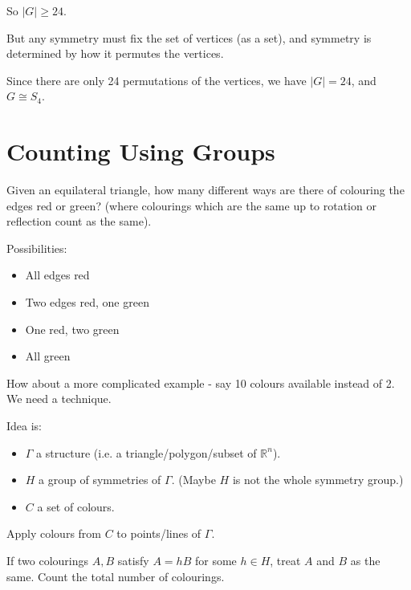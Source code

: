 \documentclass{article}
\theoremstyle{definition}
\newcommand{\reals}{\mathbb{R}}
\newcommand{\ism}{\cong}
\begin{document}
  So $|G| \geq 24$.

  But any symmetry must fix the set of vertices (as a set), and symmetry is determined by how it permutes the vertices.

  Since there are only 24 permutations of the vertices, we have $|G|=24$, and $G \ism S_4$.
\newpage
  \section{Counting Using Groups}
  Given an equilateral triangle, how many different ways are there of colouring the edges red or green? (where colourings which are the same up to rotation or reflection count as the same). 

  Possibilities: 
  \begin{itemize}
    \item All edges red
    \item Two edges red, one green
    \item One red, two green
    \item All green
  \end{itemize}
 How about a more complicated example - say 10 colours available instead of 2. We need a technique.

 Idea is: 
 \begin{itemize}
   \item 
 $\Gamma$ a structure (i.e. a triangle/polygon/subset of $\reals^n$).
 \item 
 $H$ a group of symmetries of $\Gamma$. (Maybe $H$ is not the whole symmetry group.)
 \item $C$ a set of colours.
 \end{itemize}

 Apply colours from $C$ to points/lines of $\Gamma$.

 If two colourings $A,B$ satisfy $A=hB$ for some $h \in H$, treat $A$ and $B$ as the same. Count the total number of colourings.\\
\end{document}
